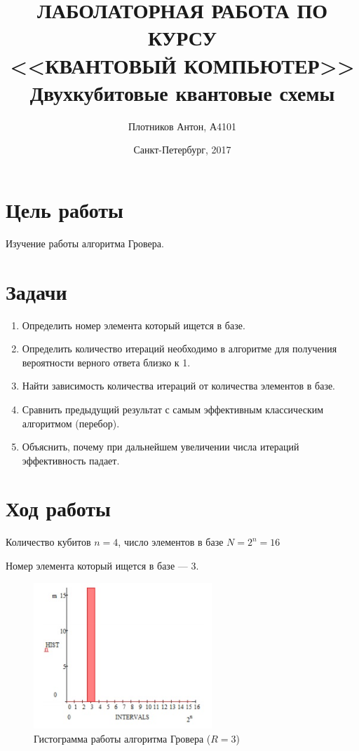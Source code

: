 \documentclass{article}
\title{ЛАБОЛАТОРНАЯ РАБОТА ПО КУРСУ\\ <<КВАНТОВЫЙ КОМПЬЮТЕР>>\\
Двухкубитовые квантовые схемы}
\date{Санкт-Петербург, 2017}
\author{Плотников Антон, А4101}
\begin{document}
\maketitle
\newpage

\section{Цель работы}
Изучение работы алгоритма Гровера.

\section{Задачи}

\begin{enumerate}
  \item	Определить номер элемента который ищется в базе.
  \item	Определить количество итераций необходимо в алгоритме для получения
    вероятности верного ответа близко к 1.
  \item	Найти зависимость количества итераций от количества элементов в базе.
  \item	Сравнить предыдущий результат с самым эффективным классическим алгоритмом (перебор).
  \item	Объяснить, почему при дальнейшем увеличении числа итераций эффективность падает.
\end{enumerate}

\section{Ход работы}

Количество кубитов $n = 4$, число элементов в базе $N = 2^n = 16$

Номер элемента который ищется в базе --- 3.

\begin{figure}[H]
  \centering
  \includegraphics[width=0.6\textwidth]{graf_4_1}
  \caption{Гистограмма работы алгоритма Гровера ($R=3$)}\label{fig:41}
\end{figure}
\end{document}
